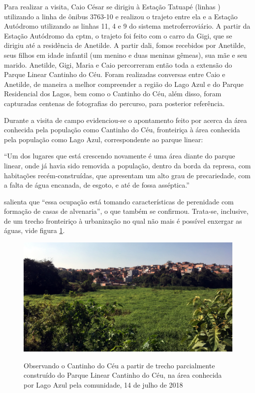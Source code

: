 	Para realizar a visita, Caio César se dirigiu à Estação Tatuapé (linhas ) utilizando a linha de ônibus 3763-10 e realizou o trajeto entre ela e a Estação Autódromo utilizando as linhas 11, 4 e 9 do sistema metroferroviário. A partir da Estação Autódromo da \gls{cptm}, o trajeto foi feito com o carro da Gigi, que se dirigiu até a residência de Anetilde. A partir dali, fomos recebidos por Anetilde, seus filhos em idade infantil (um menino e duas meninas gêmeas), sua mãe e seu marido. Anetilde, Gigi, Maria e Caio percorreram então toda a extensão do Parque Linear Cantinho do Céu. Foram realizadas conversas entre Caio e Anetilde, de maneira a melhor compreender a região do Lago Azul e do Parque Residencial dos Lagos, bem como o Cantinho do Céu, além disso, foram capturadas centenas de fotografias do percurso, para posterior referência.
	
	Durante a visita de campo evidenciou-se o apontamento feito por  acerca da área conhecida pela população como Cantinho do Céu, fronteiriça à área conhecida pela população como Lago Azul, correspondente ao parque linear:
	
	\begin{citacao}
		``Um dos lugares que está crescendo novamente é uma área diante do parque linear, onde já havia sido removida a população, dentro da borda da represa, com habitações recém-construídas, que apresentam um alto grau de precariedade, com a falta de água encanada, de esgoto, e até de fossa asséptica.''
	\end{citacao}
	
	 salienta que ``essa ocupação está tomando características de perenidade com formação de casas de alvenaria'', o que também se confirmou. Trata-se, inclusive, de um trecho fronteiriço à urbanização no qual não mais é possível enxergar as águas, vide figura \ref{fig:borda_critica}.
	
	\begin{figure}[htb]
		\centering
		\caption[Lago Azul e Cantinho do Céu em 14/07/2018]{Observando o Cantinho do Céu a partir de trecho parcialmente construído do Parque Linear Cantinho do Céu, na área conhecida por Lago Azul pela comunidade, 14 de julho de 2018}
		\includegraphics[width=\linewidth]{img/visita_borda_lago_azul_cantinho}
		\label{fig:borda_critica}
	\end{figure}
	
